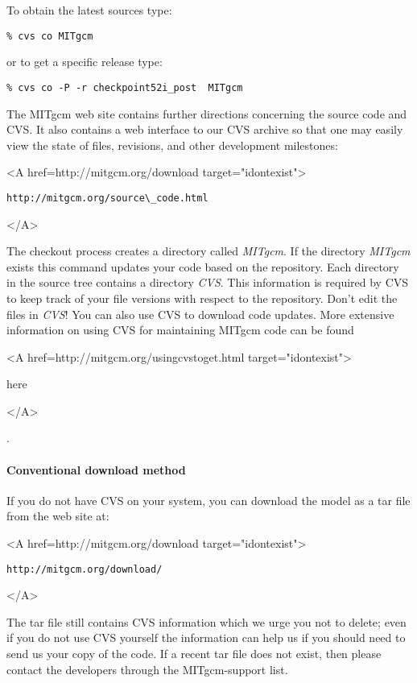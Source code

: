 To obtain the latest sources type:
\begin{verbatim}
% cvs co MITgcm
\end{verbatim}
or to get a specific release type:
\begin{verbatim}
% cvs co -P -r checkpoint52i_post  MITgcm
\end{verbatim}
The MITgcm web site contains further directions concerning the source
code and CVS.  It also contains a web interface to our CVS archive so
that one may easily view the state of files, revisions, and other
development milestones:
\begin{rawhtml} <A href=http://mitgcm.org/download target="idontexist"> \end{rawhtml}
\begin{verbatim}
http://mitgcm.org/source\_code.html
\end{verbatim}
\begin{rawhtml} </A> \end{rawhtml}


The checkout process creates a directory called \textit{MITgcm}. If
the directory \textit{MITgcm} exists this command updates your code
based on the repository. Each directory in the source tree contains a
directory \textit{CVS}. This information is required by CVS to keep
track of your file versions with respect to the repository. Don't edit
the files in \textit{CVS}!  You can also use CVS to download code
updates.  More extensive information on using CVS for maintaining
MITgcm code can be found
\begin{rawhtml} <A href=http://mitgcm.org/usingcvstoget.html target="idontexist"> \end{rawhtml}
here
\begin{rawhtml} </A> \end{rawhtml} 
.


\paragraph*{Conventional download method}
\label{sect:conventionalDownload}

If you do not have CVS on your system, you can download the model as a
tar file from the web site at:
\begin{rawhtml} <A href=http://mitgcm.org/download target="idontexist"> \end{rawhtml}
\begin{verbatim}
http://mitgcm.org/download/
\end{verbatim}
\begin{rawhtml} </A> \end{rawhtml}
The tar file still contains CVS information which we urge you not to
delete; even if you do not use CVS yourself the information can help
us if you should need to send us your copy of the code.  If a recent
tar file does not exist, then please contact the developers through
the MITgcm-support list.

